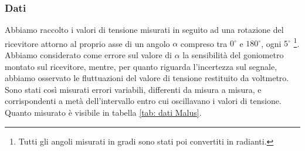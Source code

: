 \documentclass[a4paper]{article}
\begin{document}
\subsubsection{Dati}
Abbiamo raccolto i valori di tensione misurati in seguito ad una rotazione del ricevitore attorno al proprio asse di un angolo $\alpha$ compreso tra $0^\circ$ e $180^\circ$, ogni $5^\circ$ \footnote{Tutti gli angoli misurati in gradi sono stati poi convertiti in radianti.}. Abbiamo considerato come errore sul valore di $\alpha$ la sensibilità del goniometro montato sul ricevitore, mentre, per quanto riguarda l'incertezza sul segnale, abbiamo osservato le fluttuazioni del valore di tensione restituito da voltmetro. Sono stati così misurati errori variabili, differenti da misura a misura, e corrispondenti a metà dell'intervallo entro cui oscillavano i valori di tensione.
Quanto misurato è visibile in tabella \ref{tab: dati Malus}.
\end{document}
